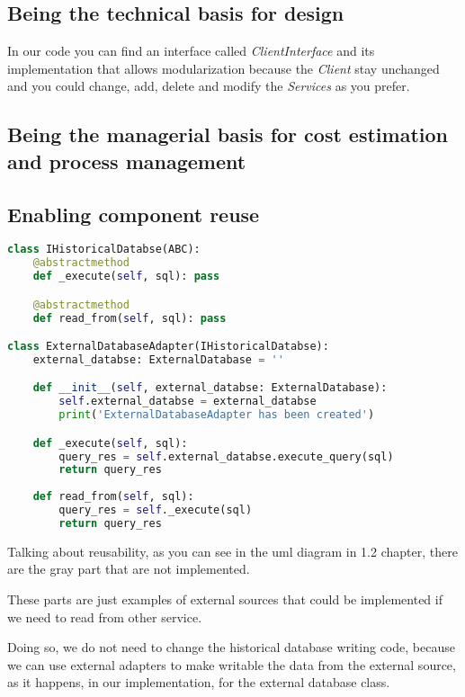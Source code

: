 \subsection{Being the technical basis for design}

In our code you can find an interface called \textit{ClientInterface} and its implementation that allows modularization because the \textit{Client} stay unchanged and you could change, add, delete and modify the \textit{Services} as you prefer.

\subsection{Being the managerial basis for cost estimation and process management}

\subsection{Enabling component reuse}

\begin{lstlisting}[language=Python]
class IHistoricalDatabse(ABC):
    @abstractmethod
    def _execute(self, sql): pass

    @abstractmethod
    def read_from(self, sql): pass

class ExternalDatabaseAdapter(IHistoricalDatabse):
    external_databse: ExternalDatabase = ''

    def __init__(self, external_databse: ExternalDatabase):
        self.external_databse = external_databse
        print('ExternalDatabaseAdapter has been created')

    def _execute(self, sql):
        query_res = self.external_databse.execute_query(sql)
        return query_res
    
    def read_from(self, sql):
        query_res = self._execute(sql) 
        return query_res   
\end{lstlisting}

Talking about reusability, as you can see in the uml diagram in 1.2 chapter, there are the gray part that are not implemented. 

These parts are just examples of external sources that could be implemented if we need to read from other service. 

Doing so, we do not need to change the historical database writing code, because we can use external adapters to make writable the data from the external source, as it happens, in our implementation, for the external database class.

